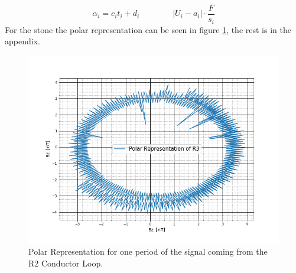 \begin{equation}
	\alpha_i=c_it_i+d_i \qquad \qquad |U_i-a_i|\cdot\frac{F}{s_i}
\end{equation}
For the stone the polar representation can be seen in figure \ref{Stone}, the rest is in the appendix.
\begin{figure}[ht]
	\includegraphics[scale=0.5]{Bild/R3}
	\centering
	\caption[Polar Representation for R2 Conductor Loop]{Polar Representation for one period of the signal coming from the R2 Conductor Loop.}
	\label{Stone}
\end{figure}\\